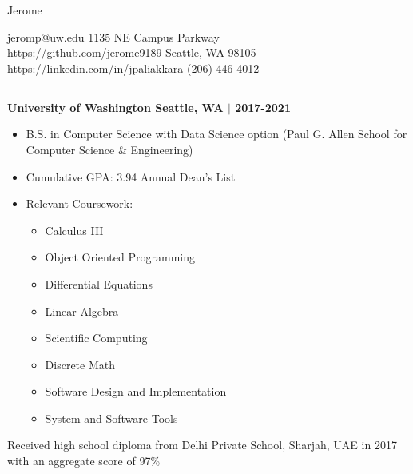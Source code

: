 \documentclass[10pt]{article}
\begin{document}
\begin{center}
    \Huge{Jerome\textbf{ \color{crimson}{Paliakkara}}}
\end{center}
jeromp@uw.edu \hfill 1135 NE Campus Parkway\\
https://github.com/jerome9189 \hfill Seattle, WA 98105\\
https://linkedin.com/in/jpaliakkara \hfill (206) 446-4012
\begin{spacing}{0.3}
\section*{\color{crimson}{Education}}
\textbf{University of Washington \hfill Seattle, WA $|$ 2017-2021}
\begin{itemize}
\setlength\itemsep{0.1em}
    \item B.S. in Computer Science with Data Science option (Paul G. Allen School for Computer Science \& Engineering)
    \item Cumulative GPA: 3.94 \qquad Annual Dean's List
    \item Relevant Coursework:
    \begin{multicols}{4}
    \begin{itemize}
        \item Calculus III
        \item Object Oriented Programming
        \item Differential Equations
        \item Linear Algebra
        \item Scientific Computing
        \item Discrete Math
        \item Software Design and Implementation
        \item System and Software Tools
    \end{itemize}
    \end{multicols}
\end{itemize}
Received high school diploma from Delhi Private School, Sharjah, UAE in 2017 with an aggregate score of 97\%

\end{spacing}
\end{document}
